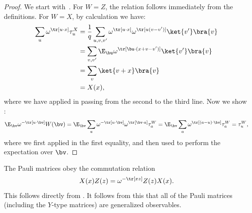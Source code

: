\documentclass[11pt]{article}
\begin{document}
\begin{proof}
  We start with~. For $W = Z$, the relation
  follows immediately from the definitions. For $W = X$, by
  calculation we have:
  \begin{align*}
    \sum_{u} \omega^{\tr[u \cdot x]} \tau^X_u &= \frac{1}{q} \sum_{u,
                                                v, v'} \omega^{\tr[u
                                                \cdot x]}
                                                \omega^{\tr[u(v -
                                                v')]} \ket{v'}\bra{v}
    \\
    &= \sum_{v, v'} \E_{\bu} \omega^{\tr[\bu \cdot (x + v - v')]}\ket{v'}\bra{v}\\
                                              &= \sum_{v} \ket{v+x}
                                                \bra{v} \\
                                              &= X(x),
  \end{align*}
  where we have applied  in passing from
  the second to the third line.
  Now we show :
  \begin{equation*}
    \E_{\bv} \omega^{-\tr[u\cdot \bv]} W(\bv) = \E_{\bv} \sum_{a}
                                         \omega^{-\tr[u \cdot \bv]}
                                         \omega^{\tr[\bv \cdot a]}
                                         \tau^W_{a}
                                         = \E_{\bv} \sum_{a}
                                         \omega^{\tr[(a - u) \cdot \bv]}
                                         \tau^W_{a}
                                       = \tau^W_{u},
  \end{equation*}
  where we first applied  in the first
  equality, and then used  to perform the
  expectation over $\bv$.
\end{proof}
The Pauli matrices obey the commutation
relation
\begin{equation}\label{eq:commutation-relations}
 X(x)Z(z) = \omega^{-\tr[xz]} Z(z)X(x).
 \end{equation}
This follows directly from . It follows from
this that all of the Pauli matrices (including the $Y$-type matrices)
are generalized observables.
\end{document}
